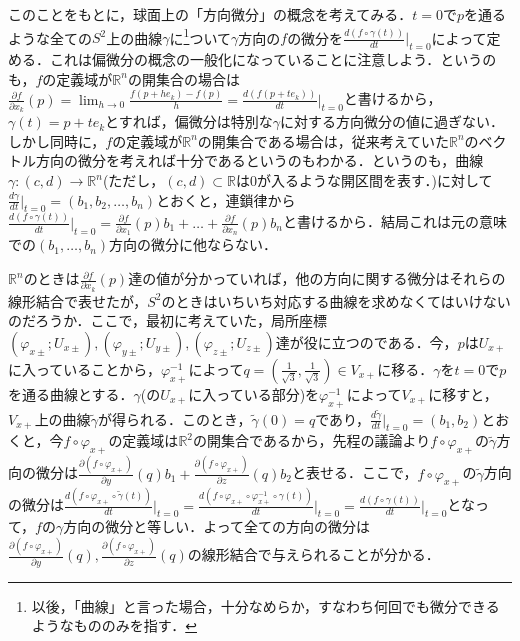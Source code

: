 \documentclass{jsarticle}
\def\realnum{{\mathbb R}}
\def\dfrac{\displaystyle\frac}
\def\delxkf{\dfrac{\partial f}{\partial x_k}}
\def\delxof{\dfrac{\partial f}{\partial x_1}}
\def\delxnf{\dfrac{\partial f}{\partial x_n}}
\begin{document}
このことをもとに，球面上の「方向微分」の概念を考えてみる．$t=0$で$p$を通るような全ての$S^2$上の曲線$\gamma$に\footnote{以後，「曲線」と言った場合，十分なめらか，すなわち何回でも微分できるようなもののみを指す．}ついて$\gamma$方向の$f$の微分を$\dfrac{d(f\circ\gamma(t))}{dt}\Big|_{t=0}$によって定める．これは偏微分の概念の一般化になっていることに注意しよう．というのも，$f$の定義域が$\realnum^n$の開集合の場合は$\delxkf(p)=\lim_{h\rightarrow 0}\dfrac{f(p+he_k)-f(p)}{h}=\dfrac{d(f(p+te_k))}{dt}\Big|_{t=0}$と書けるから，$\gamma(t)=p+te_k$とすれば，偏微分は特別な$\gamma$に対する方向微分の値に過ぎない．しかし同時に，$f$の定義域が$\realnum^n$の開集合である場合は，従来考えていた$\realnum^n$のベクトル方向の微分を考えれば十分であるというのもわかる．というのも，曲線$\gamma:(c,d)\rightarrow \realnum^n$(ただし，$(c,d)\subset\realnum$は0が入るような開区間を表す．)に対して$\dfrac{d\gamma}{dt}\Big|_{t=0}=(b_1,b_2,\dots,b_n)$とおくと，連鎖律から$\dfrac{d(f\circ\gamma(t))}{dt}\Big|_{t=0}=\delxof(p) b_1+\dots+\delxnf(p) b_n$と書けるから．結局これは元の意味での$(b_1,\dots,b_n)$方向の微分に他ならない．


$\realnum^n$のときは$\delxkf(p)$達の値が分かっていれば，他の方向に関する微分はそれらの線形結合で表せたが，$S^2$のときはいちいち対応する曲線を求めなくてはいけないのだろうか．ここで，最初に考えていた，局所座標$(\varphi_{x\pm};U_{x\pm}),(\varphi_{y\pm};U_{y\pm}),(\varphi_{z\pm};U_{z\pm})$達が役に立つのである．今，$p$は$U_{x+}$に入っていることから，$\varphi_{x+}^{-1}$によって$q=(\frac{1}{\sqrt{3}},\frac{1}{\sqrt{3}})\in V_{x+}$に移る．$\gamma$を$t=0$で$p$を通る曲線とする．$\gamma$(の$U_{x+}$に入っている部分)を$\varphi_{x+}^{-1}$によって$V_{x+}$に移すと，$V_{x+}$上の曲線$\tilde{\gamma}$が得られる．このとき，$\tilde{\gamma}(0)=q$であり，$\dfrac{d\tilde{\gamma}}{dt}\Big|_{t=0}=(b_1,b_2)$とおくと，今$f\circ \varphi_{x+}$の定義域は$\realnum^2$の開集合であるから，先程の議論より$f\circ\varphi_{x+}$の$\tilde{\gamma}$方向の微分は$\dfrac{\partial (f\circ\varphi_{x+})}{\partial y}(q)b_1+\dfrac{\partial (f\circ\varphi_{x+})}{\partial z}(q)b_2$と表せる．ここで，$f\circ \varphi_{x+}$の$\tilde{\gamma}$方向の微分は$\dfrac{d(f\circ\varphi_{x+}\circ\tilde{\gamma}(t))}{dt}\Big|_{t=0}=\dfrac{d(f\circ\varphi_{x+}\circ\varphi_{x+}^{-1}\circ\gamma(t))}{dt}\Big|_{t=0}=\dfrac{d(f\circ\gamma(t))}{dt}\Big|_{t=0}$となって，$f$の$\gamma$方向の微分と等しい．よって全ての方向の微分は$\dfrac{\partial (f\circ\varphi_{x+})}{\partial y}(q),\dfrac{\partial (f\circ\varphi_{x+})}{\partial z}(q)$の線形結合で与えられることが分かる．
\end{document}
